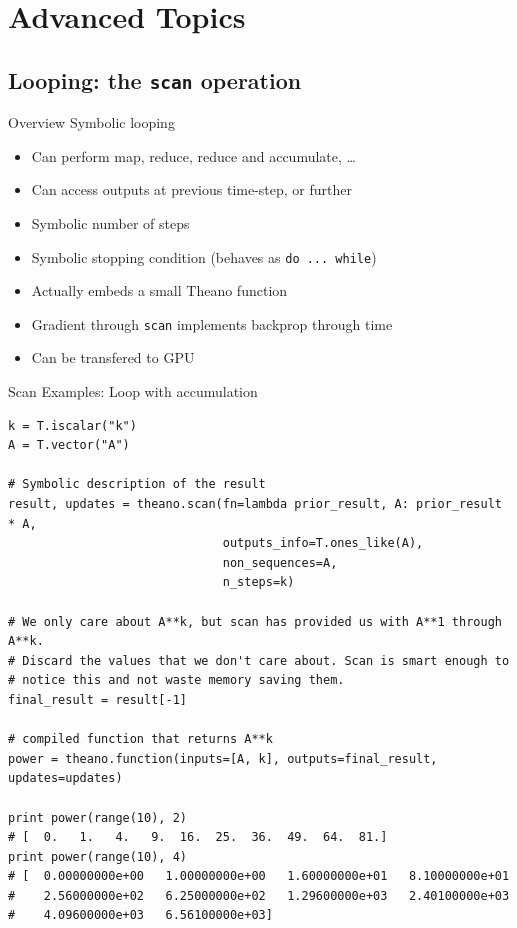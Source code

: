 \documentclass[a4paper,9pt]{beamer}
\begin{document}
\section{Advanced Topics}
\begin{frame}
  \tableofcontents[currentsection]
\end{frame}
\subsection{Looping: the {\tt scan} operation}
\begin{frame}[fragile]{Overview}
  Symbolic looping
  \begin{itemize}
    \item Can perform map, reduce, reduce and accumulate, \ldots
    \item Can access outputs at previous time-step, or further
    \item Symbolic number of steps
    \item Symbolic stopping condition (behaves as \verb|do ... while|)
    \item Actually embeds a small Theano function
    \item Gradient through \verb|scan| implements backprop through time
    \item Can be transfered to GPU
  \end{itemize}
\end{frame}

\begin{frame}[fragile]{Scan Examples: Loop with accumulation}
\footnotesize
  \begin{verbatim}
k = T.iscalar("k")
A = T.vector("A")

# Symbolic description of the result
result, updates = theano.scan(fn=lambda prior_result, A: prior_result * A,
                              outputs_info=T.ones_like(A),
                              non_sequences=A,
                              n_steps=k)

# We only care about A**k, but scan has provided us with A**1 through A**k.
# Discard the values that we don't care about. Scan is smart enough to
# notice this and not waste memory saving them.
final_result = result[-1]

# compiled function that returns A**k
power = theano.function(inputs=[A, k], outputs=final_result, updates=updates)

print power(range(10), 2)
# [  0.   1.   4.   9.  16.  25.  36.  49.  64.  81.]
print power(range(10), 4)
# [  0.00000000e+00   1.00000000e+00   1.60000000e+01   8.10000000e+01
#    2.56000000e+02   6.25000000e+02   1.29600000e+03   2.40100000e+03
#    4.09600000e+03   6.56100000e+03]
  \end{verbatim}
\end{frame}
\end{document}
